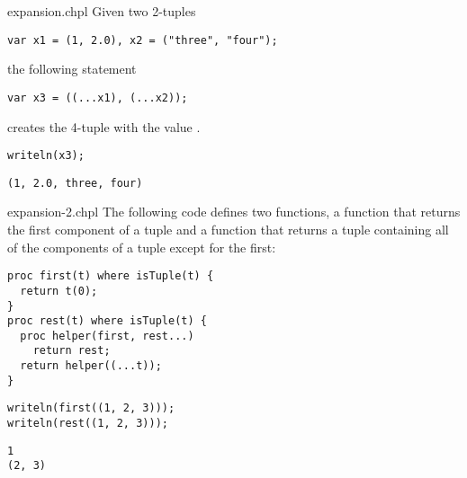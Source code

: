 \begin{chapelexample}{expansion.chpl}
Given two 2-tuples
\begin{chapel}
\begin{verbatim}
var x1 = (1, 2.0), x2 = ("three", "four");
\end{verbatim}
\end{chapel}
the following statement
\begin{chapel}
\begin{verbatim}
var x3 = ((...x1), (...x2));
\end{verbatim}
\end{chapel}
creates the 4-tuple  with the value
.
\begin{chapelpost}
\begin{verbatim}
writeln(x3);
\end{verbatim}
\end{chapelpost}
\begin{chapeloutput}
\begin{verbatim}
(1, 2.0, three, four)
\end{verbatim}
\end{chapeloutput}
\end{chapelexample}

\begin{chapelexample}{expansion-2.chpl}
The following code defines two functions, a function  that
returns the first component of a tuple and a function  that
returns a tuple containing all of the components of a tuple except for
the first:
\begin{chapel}
\begin{verbatim}
proc first(t) where isTuple(t) {
  return t(0);
}
proc rest(t) where isTuple(t) {
  proc helper(first, rest...)
    return rest;
  return helper((...t));
}
\end{verbatim}
\end{chapel}
\begin{chapelpost}
\begin{verbatim}
writeln(first((1, 2, 3)));
writeln(rest((1, 2, 3)));
\end{verbatim}
\end{chapelpost}
\begin{chapeloutput}
\begin{verbatim}
1
(2, 3)
\end{verbatim}
\end{chapeloutput}
\end{chapelexample}

